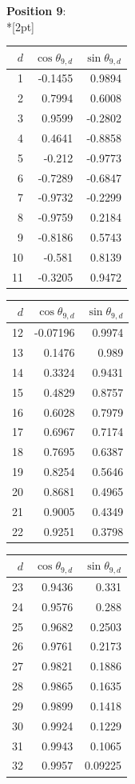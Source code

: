 \noindent \textbf{Position 9}:\\*[2pt]
{\tablefont \begin{tabular}[t]{r|rr}
$d$ & $\cos\theta_{9,d}$ & $\sin\theta_{9,d}$ \\\hline
1 & -0.1455 & 0.9894 \\
2 & 0.7994 & 0.6008 \\
3 & 0.9599 & -0.2802 \\
4 & 0.4641 & -0.8858 \\
5 & -0.212 & -0.9773 \\
6 & -0.7289 & -0.6847 \\
7 & -0.9732 & -0.2299 \\
8 & -0.9759 & 0.2184 \\
9 & -0.8186 & 0.5743 \\
10 & -0.581 & 0.8139 \\
11 & -0.3205 & 0.9472
\end{tabular}\kern4pt
\begin{tabular}[t]{r|rr}
$d$ & $\cos\theta_{9,d}$ & $\sin\theta_{9,d}$ \\\hline
12 & -0.07196 & 0.9974 \\
13 & 0.1476 & 0.989 \\
14 & 0.3324 & 0.9431 \\
15 & 0.4829 & 0.8757 \\
16 & 0.6028 & 0.7979 \\
17 & 0.6967 & 0.7174 \\
18 & 0.7695 & 0.6387 \\
19 & 0.8254 & 0.5646 \\
20 & 0.8681 & 0.4965 \\
21 & 0.9005 & 0.4349 \\
22 & 0.9251 & 0.3798
\end{tabular}\kern4pt
\begin{tabular}[t]{r|rr}
$d$ & $\cos\theta_{9,d}$ & $\sin\theta_{9,d}$ \\\hline
23 & 0.9436 & 0.331 \\
24 & 0.9576 & 0.288 \\
25 & 0.9682 & 0.2503 \\
26 & 0.9761 & 0.2173 \\
27 & 0.9821 & 0.1886 \\
28 & 0.9865 & 0.1635 \\
29 & 0.9899 & 0.1418 \\
30 & 0.9924 & 0.1229 \\
31 & 0.9943 & 0.1065 \\
32 & 0.9957 & 0.09225 \\

\end{tabular}}
